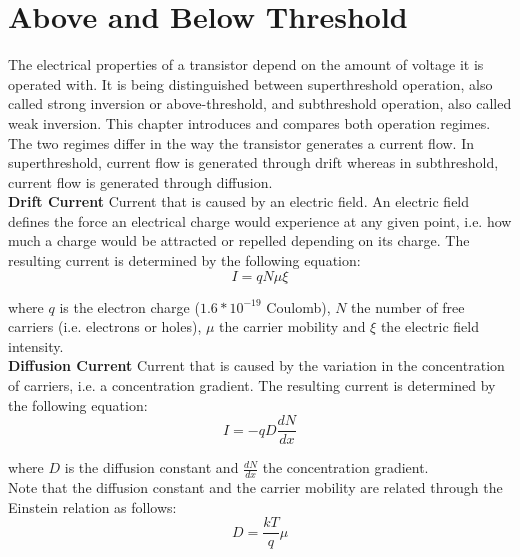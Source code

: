 \newpage
\section{Above and Below Threshold}
The electrical properties of a transistor depend on the amount of voltage it is operated with. It is being distinguished between superthreshold operation, also called strong inversion or above-threshold, and subthreshold operation, also called weak inversion. This chapter introduces and compares both operation regimes. The two regimes differ in the way the transistor generates a current flow. In superthreshold, current flow is generated through drift whereas in subthreshold, current flow is generated through diffusion.\\

\textbf{Drift Current} Current that is caused by an electric field. An electric field defines the force an electrical charge would experience at any given point, i.e. how much a charge would be attracted or repelled depending on its charge. The resulting current is determined by the following equation:\\

\begin{equation}
    I = q N \mu \xi
\end{equation}

where $q$ is the electron charge ($1.6 * 10^{-19}$ Coulomb), $N$ the number of free carriers (i.e. electrons or holes), $\mu$ the carrier mobility and $\xi$ the electric field intensity.\\

\textbf{Diffusion Current} Current that is caused by the variation in the concentration of carriers, i.e. a concentration gradient. The resulting current is determined by the following equation:\\

\begin{equation}
    I = -q D \frac{dN}{dx}
\end{equation}

where $D$ is the diffusion constant and $\frac{dN}{dx}$ the concentration gradient.\\

Note that the diffusion constant and the carrier mobility are related through the Einstein relation as follows:\\

\begin{equation}
    D = \frac{kT}{q} \mu
\end{equation}

